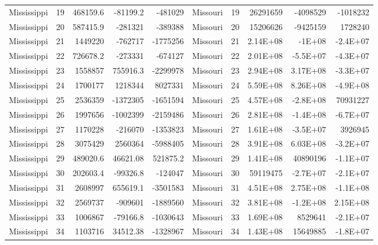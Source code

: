 \begin{landscape}
\begin{singlespace}
\begin{longtable}{lrrrr|lrrrr}
		Mississippi &  19 & 468159.6 & -81199.2 & -481029 & Missouri &  19 & 26291659 & -4098529 & -1018232 \\
		Mississippi &  20 & 587415.9 & -281321 & -389388 & Missouri &  20 & 15206626 & -9425159 & 1728240 \\
		Mississippi &  21 & 1449220 & -762717 & -1775256 & Missouri &  21 & 2.14E+08 & -1E+08 & -2.4E+07 \\
		Mississippi &  22 & 726678.2 & -273331 & -674127 & Missouri &  22 & 2.01E+08 & -5.5E+07 & -4.3E+07 \\
		Mississippi &  23 & 1558857 & 755916.3 & -2299978 & Missouri &  23 & 2.94E+08 & 3.17E+08 & -3.3E+07 \\
		Mississippi &  24 & 1700177 & 1218344 & 8027331 & Missouri &  24 & 5.59E+08 & 8.26E+08 & -4.9E+08 \\
		Mississippi &  25 & 2536359 & -1372305 & -1651594 & Missouri &  25 & 4.57E+08 & -2.8E+08 & 70931227 \\
		Mississippi &  26 & 1997656 & -1002399 & -2159486 & Missouri &  26 & 2.81E+08 & -1.4E+08 & -6.7E+07 \\
		Mississippi &  27 & 1170228 & -216070 & -1353823 & Missouri &  27 & 1.61E+08 & -3.5E+07 & 3926945 \\
		Mississippi &  28 & 3075429 & 2560364 & -5988405 & Missouri &  28 & 3.91E+08 & 6.03E+08 & -3.2E+07 \\
		Mississippi &  29 & 489020.6 & 46621.08 & 521875.2 & Missouri &  29 & 1.41E+08 & 40890196 & -1.1E+07 \\
		Mississippi &  30 & 202603.4 & -99326.8 & -124047 & Missouri &  30 & 59119475 & -2.7E+07 & -2.1E+07 \\
		Mississippi &  31 & 2608997 & 655619.1 & -3501583 & Missouri &  31 & 4.51E+08 & 2.75E+08 & -1.1E+08 \\
		Mississippi &  32 & 2569737 & -909601 & -1889560 & Missouri &  32 & 3.81E+08 & -1.2E+08 & 2.15E+08 \\
		Mississippi &  33 & 1006867 & -79166.8 & -1030643 & Missouri &  33 & 1.69E+08 & 8529641 & -2.1E+07 \\
		Mississippi &  34 & 1103716 & 34512.38 & -1328967 & Missouri &  34 & 1.43E+08 & 15649885 & -1.8E+07\\


\end{longtable}
\end{singlespace}
\end{landscape}
